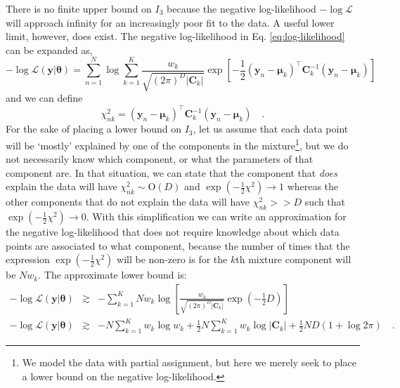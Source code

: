 \documentclass{elsarticle}
\newcommand{\vect}[1]{\boldsymbol{\mathbf{#1}}}
\renewcommand{\vec}[1]{\vect{#1}}
\def\cov{C}
\def\vecmean{\vect{\mu}}
\def\weight{w}
\def\datum{y}
\def\data{\vect{\datum}}
\def\likelihood{\mathcal{L}}
\begin{document}
There is no finite upper bound on $I_{3}$ because the negative log-likelihood
$-\log\likelihood$ will approach infinity for an increasingly poor fit to the
data. A useful lower limit, however, does exist. The negative log-likelihood
in Eq. \ref{eq:log-likelihood} can be expanded as,
\begin{equation}
    -\log\mathcal{L}\left(\vec{\data}|\vec{\theta}\right) = \sum_{n=1}^{N}\log\sum_{k=1}^{K}\frac{\weight_k}{\sqrt{(2\pi)^{D}|\vec{\cov}_k|}}\exp\left[-\frac{1}{2}\left(\vec{\data}_n - \vecmean_k\right)^\intercal{}\vec{\cov}_{k}^{-1}\left(\vec{\data}_n - \vecmean_k\right)\right]
\end{equation}
\noindent{}and we can define
\begin{equation}
\chi^{2}_{nk} = \left(\vec{\data}_{n} - \vecmean_{k}\right)^\intercal{}\vec{\cov}_{k}^{-1}\left(\vec{\data}_{n} - \vecmean_{k}\right) \quad .
\end{equation}
For the sake of placing a lower bound on $I_{3}$, let us assume that each data
point will be `mostly' explained by one of the components in the 
mixture\footnote{We model the data with partial assignment, but here we merely 
seek to place a lower bound on the negative log-likelihood.}, but we do not 
necessarily know which component, or what the parameters of that component are. 
In that situation, we can state that the component that \emph{does} explain
the data will have $\chi_{nk}^2 \sim \textrm{O}\left(D\right)$ and $\exp(-\frac{1}{2}\chi^2) \rightarrow 1$
whereas the other components that do not explain the data will have 
$\chi_{nk}^2 >> D$ such that $\exp(-\frac{1}{2}\chi^2) \rightarrow 0$. With
this simplification we can write an approximation for the negative log-likelihood
that does not require knowledge about which data points are associated to what
component, because the number of times that the expression $\exp(-\frac{1}{2}\chi^2)$
will be non-zero is for the $k$th mixture component will be $N\weight_k$. The
approximate lower bound is:
\begin{eqnarray}
    -\log\likelihood\left(\vec{\data}|\vec{\theta}\right) & \gtrsim & -\sum_{k=1}^{K}N\weight_{k}\log\left[\frac{\weight_k}{\sqrt{(2\pi)^{D}|\vec{\cov}_k|}}\exp\left(-\frac{1}{2}{D}\right)\right] \\
    -\log\likelihood\left(\vec{\data}|\vec{\theta}\right) & \gtrsim & -N\sum_{k=1}^{K}\weight_{k}\log{\weight_k} + \frac{1}{2}N\sum_{k=1}^{K}\weight_{k}\log{|\vec{\cov}_k|} + \frac{1}{2}ND\left(1 + \log{2\pi}\right) \quad . \nonumber
    \label{eq:logl-lower-bound}
\end{eqnarray}
\end{document}
